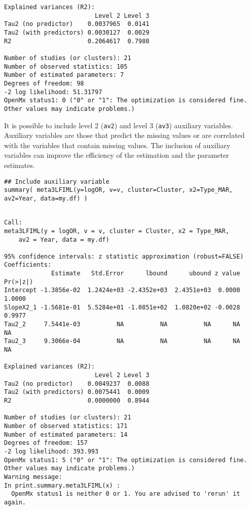 \documentclass[11pt]{article}
\begin{document}
\begin{enumerate}
\begin{verbatim}
Explained variances (R2):
                         Level 2 Level 3
Tau2 (no predictor)    0.0037965  0.0141
Tau2 (with predictors) 0.0030127  0.0029
R2                     0.2064617  0.7980

Number of studies (or clusters): 21
Number of observed statistics: 105
Number of estimated parameters: 7
Degrees of freedom: 98
-2 log likelihood: 51.31797 
OpenMx status1: 0 ("0" or "1": The optimization is considered fine.
Other values may indicate problems.)
\end{verbatim}

It is possible to include level 2 (\texttt{av2}) and level 3 (\texttt{av3}) auxiliary variables. Auxiliary variables are those that predict the missing values or are correlated with the variables that contain missing values. The inclusion of auxiliary variables can improve the efficiency of the estimation and the parameter estimates. 
\begin{verbatim}
## Include auxiliary variable
summary( meta3LFIML(y=logOR, v=v, cluster=Cluster, x2=Type_MAR, av2=Year, data=my.df) )
\end{verbatim}

\begin{verbatim}

Call:
meta3LFIML(y = logOR, v = v, cluster = Cluster, x2 = Type_MAR, 
    av2 = Year, data = my.df)

95% confidence intervals: z statistic approximation (robust=FALSE)
Coefficients:
             Estimate   Std.Error      lbound      ubound z value Pr(>|z|)
Intercept -1.3856e-02  1.2424e+03 -2.4352e+03  2.4351e+03  0.0000   1.0000
SlopeX2_1 -1.5681e-01  5.5284e+01 -1.0851e+02  1.0820e+02 -0.0028   0.9977
Tau2_2     7.5441e-03          NA          NA          NA      NA       NA
Tau2_3     9.3066e-04          NA          NA          NA      NA       NA

Explained variances (R2):
                         Level 2 Level 3
Tau2 (no predictor)    0.0049237  0.0088
Tau2 (with predictors) 0.0075441  0.0009
R2                     0.0000000  0.8944

Number of studies (or clusters): 21
Number of observed statistics: 171
Number of estimated parameters: 14
Degrees of freedom: 157
-2 log likelihood: 393.993 
OpenMx status1: 5 ("0" or "1": The optimization is considered fine.
Other values may indicate problems.)
Warning message:
In print.summary.meta3LFIML(x) :
  OpenMx status1 is neither 0 or 1. You are advised to 'rerun' it again.
\end{verbatim}
\end{enumerate}
\end{document}
